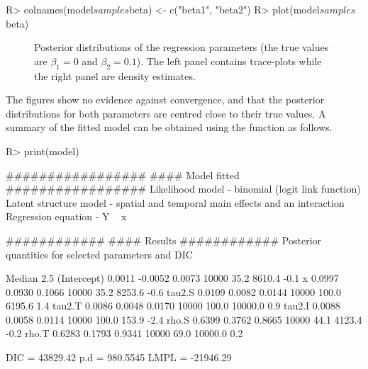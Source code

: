 \documentclass[article, nojss]{jss}
\begin{document}
\begin{CodeInput}
R>  colnames(model$samples$beta) <- c("beta1", "beta2")
R>  plot(model$samples$beta)
\end{CodeInput}

\begin{figure}
\centering 
{}
\caption{Posterior distributions of the regression parameters (the true values are $\beta_1=0$ and $\beta_2=0.1$). The left panel contains trace-plots while the right panel are density estimates.\label{fig sim1}}
\end{figure} 


The figures show no evidence against convergence, and that the posterior distributions for both parameters are centred close to their true values. A summary of the fitted model can be obtained using the  function as follows.

\newpage
\begin{CodeInput}
R>  print(model)
\end{CodeInput}


\begin{CodeOutput}
#################
#### Model fitted
#################
Likelihood model - binomial (logit link function) 
Latent structure model - spatial and temporal main effects and an interaction
Regression equation - Y ~ x

############
#### Results
############
Posterior quantities for selected parameters and DIC

            Median    2.5%
(Intercept) 0.0011 -0.0052 0.0073    10000     35.2      8610.4        -0.1
x           0.0997  0.0930 0.1066    10000     35.2      8253.6        -0.6
tau2.S      0.0109  0.0082 0.0144    10000    100.0      6195.6         1.4
tau2.T      0.0086  0.0048 0.0170    10000    100.0     10000.0         0.9
tau2.I      0.0088  0.0058 0.0114    10000    100.0       153.9        -2.4
rho.S       0.6399  0.3762 0.8665    10000     44.1      4123.4        -0.2
rho.T       0.6283  0.1793 0.9341    10000     69.0     10000.0         0.2

DIC =  43829.42       p.d =  980.5545       LMPL =  -21946.29 
\end{CodeOutput}
\end{document}
